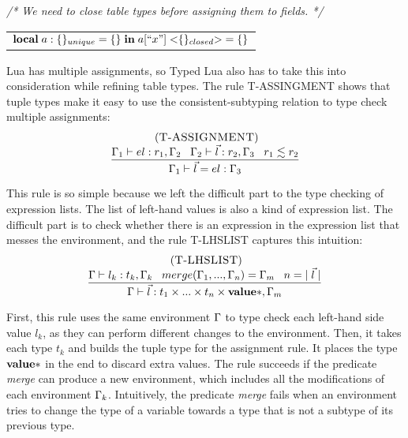\textit{/* We need to close table types before assigning them to fields. */}
\begin{center}
\begin{tabular}{l}
$\mathbf{local} \; a:\{\}_{unique} = \{\} \; \mathbf{in} \; a[``x"] \; {<}\{\}_{closed}{>} = \{\}$
\end{tabular}
\end{center}

Lua has multiple assignments, so Typed Lua also has to take this into
consideration while refining table types.
The rule \textsc{T-ASSINGMENT} shows that tuple types make it easy
to use the consistent-subtyping relation to type check multiple assignments:
\[
\begin{array}{c}
\; (\textsc{T-ASSIGNMENT})\\
\begin{array}{c}
\dfrac{\Gamma_{1} \vdash el:r_{1}, \Gamma_{2} \;\;\;
       \Gamma_{2} \vdash \vec{l}:r_{2}, \Gamma_{3} \;\;\;
       r_{1} \lesssim r_{2}}
      {\Gamma_{1} \vdash \vec{l} = el:\Gamma_{3}}
\end{array}
\end{array}
\]

This rule is so simple because we left the difficult part to the
type checking of expression lists.
The list of left-hand values is also a kind of expression list.
The difficult part is to check whether there is an expression in
the expression list that messes the environment, and the rule
\textsc{T-LHSLIST} captures this intuition:
\[
\begin{array}{c}
\; (\textsc{T-LHSLIST})\\
\dfrac{\Gamma \vdash l_{k}:t_{k}, \Gamma_{k} \;\;\;
       merge(\Gamma_{1}, ..., \Gamma_{n}) = \Gamma_{m} \;\;\;
       n = |\;\vec{l}\;|}
      {\Gamma \vdash \vec{l}:t_{1} \times ... \times t_{n} \times \mathbf{value}{*}, \Gamma_{m}}
\end{array}
\]

First, this rule uses the same environment $\Gamma$ to type check each
left-hand side value $l_{k}$, as they can perform different changes
to the environment.
Then, it takes each type $t_{k}$ and builds the tuple type for
the assignment rule.
It places the type $\mathbf{value}{*}$ in the end to discard extra values.
The rule succeeds if the predicate \emph{merge} can
produce a new environment, which includes all the modifications
of each environment $\Gamma_{k}$.
Intuitively, the predicate \emph{merge} fails when an environment
tries to change the type of a variable towards a type that is not
a subtype of its previous type.

